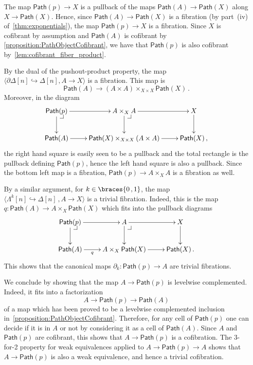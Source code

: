\documentclass[reqno,10pt,a4paper,oneside]{amsart}
\makeatletter
\renewenvironment{proof}[1][\proofname] {\par\pushQED{\qed}\normalfont\topsep6\p@\@plus6\p@\relax\trivlist\item[\hskip\labelsep\bf#1\@addpunct{.}]\ignorespaces}{\popQED\endtrivlist\@endpefalse}
\numberwithin{equation}{section}
\theoremstyle{mythm}
\theoremstyle{mydef}
\theoremstyle{myrmk}
\newcommand{\pullback}[1]{\save*!/#1-1.2pc/#1:(-1,1)@^{|-}\restore}
\newcommand{\drpullback}{\pullback{dr}}
\newcommand{\co}{\colon}
\DeclarePairedDelimiter\braces\lbrace\rbrace
\newcommand{\Path}{\mathsf{Path}}
\makeatother
\begin{document}
\begin{proof} The map $\Path(p) \rightarrow X$ is a pullback of the maps $\Path(A) \rightarrow \Path(X)$ along $X \rightarrow \Path(X)$. Hence, since $\Path(A) \rightarrow \Path(X)$ is a fibration (by part~(iv) of~\cref{thm:exponentials}), the map $\Path(p) \rightarrow X$ is a fibration. Since $X$ is cofibrant by assumption and $\Path(A)$ is  cofibrant by \cref{proposition:PathObjectCofibrant}, we have that $\Path(p)$ is also cofibrant by~\cref{lem:cofibrant_fiber_product}. 

By the dual of the pushout-product property, the map $\langle \partial \Delta[n] \hookrightarrow \Delta[n] ,  A \rightarrow X \rangle$ is a fibration. This map is 
\[ 
\Path(A) \rightarrow (A \times A) \times_{X \times X} \Path(X) \, .
\] 
Moreover, in the diagram
\[
\xymatrix{
\Path(p) \drpullback \ar[r] \ar[d] & A \times_{X} A \ar[d] \ar[r] \drpullback & X \ar[d] \\
\Path(A) \ar[r] & \Path(X) \times_{X \times X}  (A \times A) \ar[r]  & \Path(X) \, ,
}
 \]
the right hand square is easily seen to be a pullback and the total rectangle is the pullback defining $\Path(p)$, hence the left hand square is also a pullback. Since the bottom left map is a fibration,  $\Path(p) \rightarrow A \times_{X} A$ is a fibration as well.

By a similar argument, for $k \in \braces{ 0 \, , 1}$, the map $\langle \Lambda^k[n] \hookrightarrow \Delta[n] \, , A \rightarrow X\rangle$ is a trivial fibration. Indeed, this is the map $q \co \Path(A) \rightarrow  A  \times_X \Path(X)$ which fits into the pullback diagrams
\[
\xymatrix{
\Path(p) \drpullback \ar[r] \ar[d] & A  \ar[d] \ar[r] \drpullback & X \ar[d] \\
\Path(A) \ar[r]_-{q} & A \times_X \Path(X) \ar[r]  & \Path(X) \, .
}
 \]
This shows that the canonical maps $\partial_k \co \Path(p) \rightarrow A$ are trivial fibrations.

We conclude by showing that the map $A \rightarrow \Path(p)$ is levelwise complemented. Indeed, it fits into a factorization 
\[
A \rightarrow \Path(p) \rightarrow \Path(A)
\] 
of a map which has been proved to be a levelwise complemented inclusion in~\cref{proposition:PathObjectCofibrant}. Therefore, for any cell of $\Path(p)$ one can decide if it is in $A$ or not by considering it as a cell of $\Path(A)$. Since $A$ and $\Path(p)$ are cofibrant, this shows that $A \rightarrow \Path(p)$ is a cofibration. The 3-for-2 property for weak equivalences applied to $A \rightarrow \Path(p) \rightarrow A$ shows that  $A \rightarrow \Path(p)$ is also a weak equivalence, and hence a trivial cofibration.
\end{proof}
\end{document}
